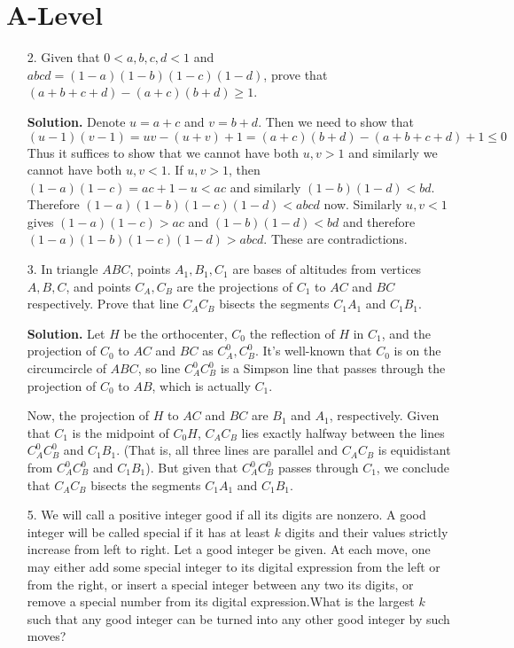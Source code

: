 \documentclass[11pt,a4paper]{article}
\begin{document}
	\section*{A-Level}
	\begin{enumerate}
		\item[2.] Given that $0 < a, b, c, d < 1$ and $abcd = (1 - a)(1 - b)(1 - c)(1 - d)$, prove that $(a + b + c + d) -(a + c)(b + d) \ge 1$. 
		
		\textbf{Solution.} Denote $u=a+c$ and $v=b+d$. Then we need to show that 
		\[
		(u-1)(v-1)=uv-(u+v)+1=(a+c)(b+d)-(a+b+c+d)+1\le 0
		\]
		Thus it suffices to show that we cannot have both $u, v>1$ and similarly we cannot have both $u, v<1$. If $u, v>1$, then $(1-a)(1-c)=ac+1-u<ac$ and similarly $(1-b)(1-d)<bd$. Therefore $(1-a)(1-b)(1-c)(1-d)<abcd$ now. Similarly $u, v<1$ gives $(1-a)(1-c)>ac$ and $(1-b)(1-d)<bd$ and therefore $(1-a)(1-b)(1-c)(1-d)>abcd$. These are contradictions. 
		
		\item[3.]  In triangle $ABC$, points $A_1,B_1,C_1$ are bases of altitudes from vertices $A,B,C$, and points $C_A,C_B$ are the projections of $C_1$ to $AC$ and $BC$ respectively. Prove that line $C_AC_B$ bisects the segments $C_1A_1$ and $C_1B_1$.
		
		\textbf{Solution.} Let $H$ be the orthocenter, $C_0$ the reflection of $H$ in $C_1$, and the projection of $C_0$ to $AC$ and $BC$ as $C^{0}_A, C^{0}_B$. It's well-known that $C_0$ is on the circumcircle of $ABC$, so line $C^{0}_AC^{0}_B$ is a Simpson line that passes through the projection of $C_0$ to $AB$, which is actually $C_1$. 
		
		Now, the projection of $H$ to $AC$ and $BC$ are $B_1$ and $A_1$, respectively. Given that $C_1$ is the midpoint of $C_0H$, $C_AC_B$ lies exactly halfway between the lines $C^{0}_AC^{0}_B$ and $C_1B_1$. (That is, all three lines are parallel and $C_AC_B$ is equidistant from $C^{0}_AC^{0}_B$ and $C_1B_1$). But given that $C^{0}_AC^{0}_B$ passes through $C_1$, we conclude that $C_AC_B$ bisects the segments $C_1A_1$ and $C_1B_1$.
		
		\item[5.] 
		We will call a positive integer good if all its digits are nonzero. A good integer will be
		called special if it has at least $k$ digits and their values strictly increase from left to
		right. Let a good integer be given. At each move, one may either add some special
		integer to its digital expression from the left or from the right, or insert a special integer
		between any two its digits, or remove a special number from its digital expression.What
		is the largest $k$ such that any good integer can be turned into any other good integer
		by such moves?
		

\end{enumerate}
\end{document}

